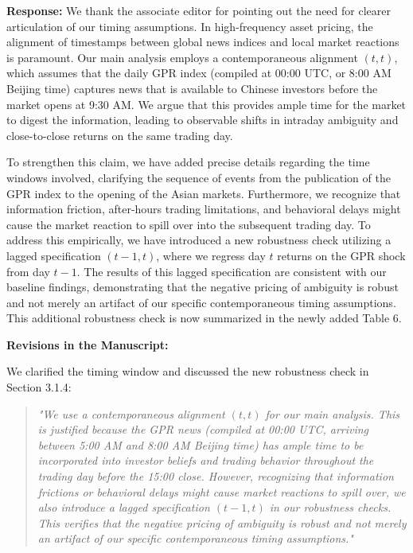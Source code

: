 \documentclass[12pt]{article}
\begin{document}
\begin{highlightbox}
\textbf{Response:} We thank the associate editor for pointing out the need for clearer articulation of our timing assumptions. In high-frequency asset pricing, the alignment of timestamps between global news indices and local market reactions is paramount. Our main analysis employs a contemporaneous alignment $(t, t)$, which assumes that the daily GPR index (compiled at 00:00 UTC, or 8:00 AM Beijing time) captures news that is available to Chinese investors before the market opens at 9:30 AM. We argue that this provides ample time for the market to digest the information, leading to observable shifts in intraday ambiguity and close-to-close returns on the same trading day.

To strengthen this claim, we have added precise details regarding the time windows involved, clarifying the sequence of events from the publication of the GPR index to the opening of the Asian markets. Furthermore, we recognize that information friction, after-hours trading limitations, and behavioral delays might cause the market reaction to spill over into the subsequent trading day. To address this empirically, we have introduced a new robustness check utilizing a lagged specification $(t-1, t)$, where we regress day $t$ returns on the GPR shock from day $t-1$. The results of this lagged specification are consistent with our baseline findings, demonstrating that the negative pricing of ambiguity is robust and not merely an artifact of our specific contemporaneous timing assumptions. This additional robustness check is now summarized in the newly added Table 6.
\end{highlightbox}

\begin{highlightbox}
\textbf{Revisions in the Manuscript:}

We clarified the timing window and discussed the new robustness check in Section 3.1.4:
\vspace{0.2cm}
\begin{quote}
\color{red}\itshape "We use a contemporaneous alignment $(t, t)$ for our main analysis. This is justified because the GPR news (compiled at 00:00 UTC, arriving between 5:00 AM and 8:00 AM Beijing time) has ample time to be incorporated into investor beliefs and trading behavior throughout the trading day before the 15:00 close. However, recognizing that information frictions or behavioral delays might cause market reactions to spill over, we also introduce a lagged specification $(t-1, t)$ in our robustness checks. This verifies that the negative pricing of ambiguity is robust and not merely an artifact of our specific contemporaneous timing assumptions."
\end{quote}
\end{highlightbox}
\end{document}
